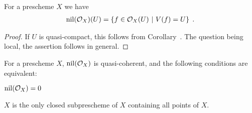 \documentclass[a4paper,parskip=half,numbers=enddot, DIV=12]{scrreprt}
\begin{document}
\begin{fact}
    For a prescheme $X$ we have
    \begin{align*}
        \operatorname{nil}(\mathcal{O}_X)(U) = \left\{f\in \mathcal{O}_X(U) \ \middle|\  V(f) = U\right\}\;.
    \end{align*}
\end{fact}
\begin{proof}
    If $U$ is quasi-compact, this follows from Corollary~. The question being local, the assertion follows in general.
\end{proof}
\begin{prop}
    For a prescheme $X$, $\operatorname{nil}(\mathcal{O}_X)$ is quasi-coherent, and the following conditions are equivalent:
    \begin{alphanumerate}
    \item 
        $\operatorname{nil}(\mathcal{O}_X) = 0$
    \item 
        $X$ is the only closed subprescheme of $X$ containing all points of $X$.
    \end{alphanumerate}
\end{prop}
\end{document}
